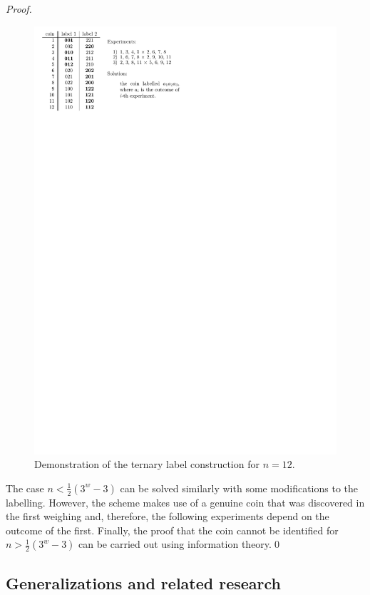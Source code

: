 \begin{proof}
\begin{figure}[h]
\begin{center}
\includegraphics{pictures/coins12-th.pdf}
\end{center}
\caption{Demonstration of the ternary label construction for $n=12$.}
\label{fig:coins12scheme}
\end{figure}

The case $n < \frac{1}{2}(3^w - 3)$ can be solved similarly with some modifications
  to the labelling.
However, the scheme makes use of a genuine coin that was discovered in the first
  weighing and, therefore, the following experiments depend on the outcome of
  the first.
Finally, the proof that the coin cannot be identified for
  $n > \frac{1}{2}(3^w - 3)$ can be carried out using information theory.\qed
\end{proof}

\subsection{Generalizations and related research}

